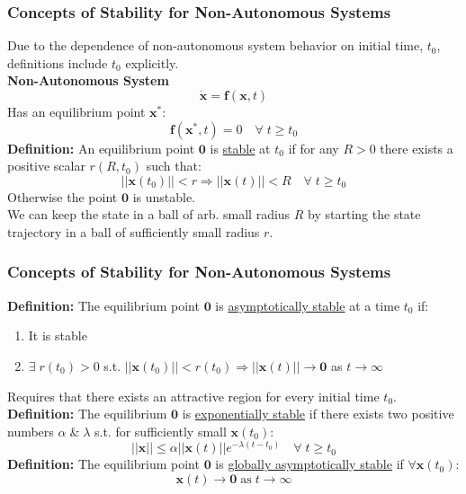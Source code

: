 \documentclass[11pt,handout]{beamer}   %
\begin{document}
\begin{frame}
\frametitle{Concepts of Stability for Non-Autonomous Systems}
\small
Due to the dependence of non-autonomous system behavior on initial time, $t_0$, definitions include $t_0$ explicitly.\\
\vspace{6pt}
\textbf{Non-Autonomous System}
\begin{equation*}
\dot{\mathbf{x}} = \mathbf{f}(\mathbf{x},t)
\end{equation*}
Has an equilibrium point $\mathbf{x}^*$:
\begin{equation*}
\mathbf{f}(\mathbf{x}^*,t) = 0 \quad \forall  \; t \geq t_0
\end{equation*}
\textbf{Definition:} An equilibrium point $\mathbf{0}$ is \underline{stable} at $t_0$ if for any $R>0$ there exists a positive scalar $r(R,t_0)$ such that:
\begin{equation*}
||\mathbf{x}(t_0)|| < r \Rightarrow ||\mathbf{x}(t)||<R \quad \forall \; t \geq t_0
\end{equation*}
Otherwise the point $\mathbf{0}$ is unstable.\\
\vspace{6pt}
We can keep the state in a ball of arb. small radius $R$ by starting the state trajectory in a ball of sufficiently small radius $r$.
\end{frame}

\begin{frame}
\frametitle{Concepts of Stability for Non-Autonomous Systems}
\small
\textbf{Definition:} The equilibrium point $\mathbf{0}$ is \underline{asymptotically stable} at a time $t_0$ if:
\begin{enumerate}
\item It is stable
\item $\exists \; r(t_0) > 0$ s.t. $||\mathbf{x}(t_0)||<r(t_0) \Rightarrow ||\mathbf{x}(t)|| \rightarrow \mathbf{0}$ as $t \rightarrow \infty$
\end{enumerate}
Requires that there exists an attractive region for every initial time $t_0$.\\
\vspace{6pt}
\textbf{Definition:} The equilibrium $\mathbf{0}$ is \underline{exponentially stable} if there exists two positive numbers $\alpha \; \& \; \lambda$ s.t. for sufficiently small $\mathbf{x}(t_0)$:
\begin{equation*}
|| \mathbf{x} || \leq \alpha || \mathbf{x} (t) || e^{- \lambda(t - t_0)} \quad \forall \; t \geq t_0
\end{equation*}
\textbf{Definition:} The equilibrium point $\mathbf{0}$ is \underline{globally asymptotically stable} if $\forall \mathbf{x}(t_0)$:
\begin{equation*}
\mathbf{x}(t) \rightarrow \mathbf{0} \; \text{as} \; t \rightarrow \infty
\end{equation*}
\end{frame}
\end{document}
